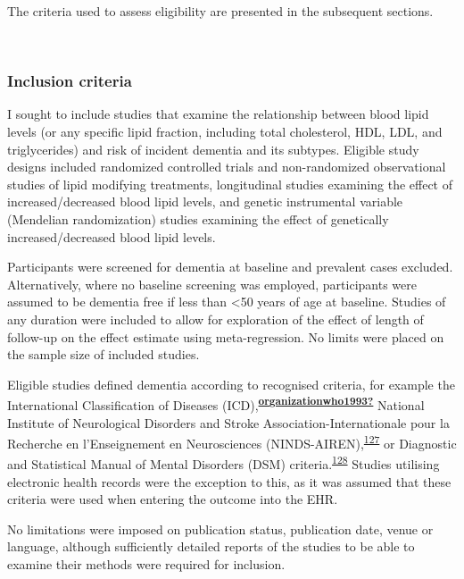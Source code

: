 \documentclass[a4paper, twoside]{templates/ociamthesis}
\begin{document}
The criteria used to assess eligibility are presented in the subsequent sections.

~

\hypertarget{inclusion-criteria}{%
\subsubsection{Inclusion criteria}\label{inclusion-criteria}}

I sought to include studies that examine the relationship between blood lipid levels (or any specific lipid fraction, including total cholesterol, HDL, LDL, and triglycerides) and risk of incident dementia and its subtypes. Eligible study designs included randomized controlled trials and non-randomized observational studies of lipid modifying treatments, longitudinal studies examining the effect of increased/decreased blood lipid levels, and genetic instrumental variable (Mendelian randomization) studies examining the effect of genetically increased/decreased blood lipid levels.

Participants were screened for dementia at baseline and prevalent cases excluded. Alternatively, where no baseline screening was employed, participants were assumed to be dementia free if less than \textless50 years of age at baseline. Studies of any duration were included to allow for exploration of the effect of length of follow-up on the effect estimate using meta-regression. No limits were placed on the sample size of included studies.

Eligible studies defined dementia according to recognised criteria, for example the International Classification of Diseases (ICD),\textsuperscript{\protect\hyperlink{ref-organizationwho1993}{\textbf{organizationwho1993?}}} National Institute of Neurological Disorders and Stroke Association-Internationale pour la Recherche en l'Enseignement en Neurosciences (NINDS-AIREN),\textsuperscript{\protect\hyperlink{ref-roman1993}{127}} or Diagnostic and Statistical Manual of Mental Disorders (DSM) criteria.\textsuperscript{\protect\hyperlink{ref-edition2013}{128}} Studies utilising electronic health records were the exception to this, as it was assumed that these criteria were used when entering the outcome into the EHR.

No limitations were imposed on publication status, publication date, venue or language, although sufficiently detailed reports of the studies to be able to examine their methods were required for inclusion.

~
\end{document}
